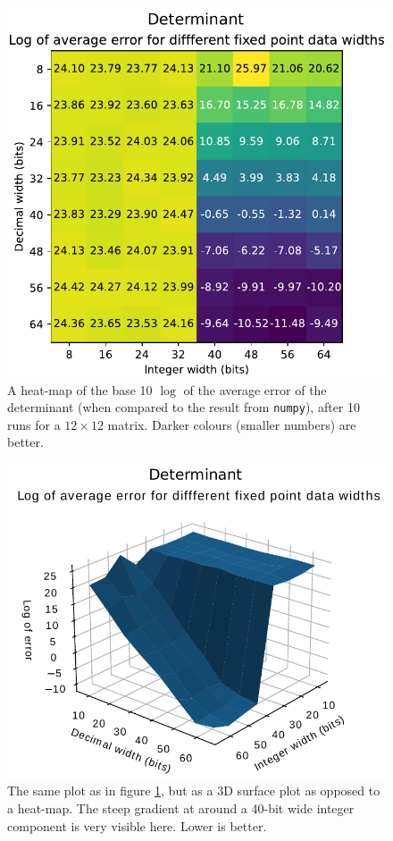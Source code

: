 \documentclass[12pt]{article}
\begin{document}
\begin{figure}[thp]
	\centering
	
	\includegraphics[width=\textwidth]{heatmap_full_det.pdf}
	
	\caption{A heat-map of the base 10 $\log$ of the average error of the determinant (when compared to the result from \lstinline|numpy|), after 10 runs for a $12 \times 12$ matrix. Darker colours (smaller numbers) are better.}
	\label{full_heat_det}
\end{figure}

\begin{figure}[thp]
	\centering
	
	\includegraphics[width=\textwidth]{sfc_plot_full_det.pdf}
	
	\caption{The same plot as in figure \ref{full_heat_det}, but as a 3D surface plot as opposed to a heat-map. The steep gradient at around a 40-bit wide integer component is very visible here. Lower is better.}
	\label{full_sfc_det}
\end{figure}
\end{document}
